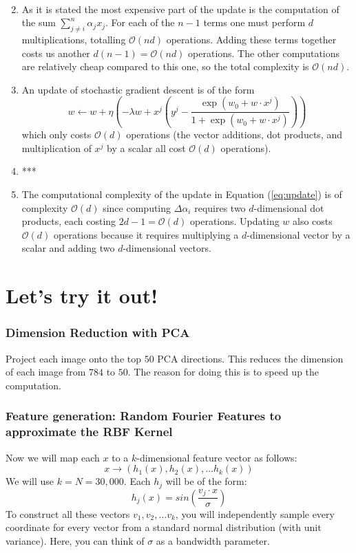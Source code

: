 \documentclass{article}
\begin{document}
\begin{enumerate}
\[\begin{array}{crcl}
		\end{array}
	\]
	\item As it is stated the most expensive part of the update is the computation of the sum $\sum_{j\neq i}^n \alpha_jx_j$. For each of the $n-1$ terms one must perform $d$ multiplications, totalling $\mathcal{O}(nd)$ operations. Adding these terms together costs us another $d(n-1)=\mathcal{O}(nd)$ operations. The other computations are relatively cheap compared to this one, so the total complexity is $\mathcal{O}(nd)$.
	\item An update of stochastic gradient descent is of the form
	\[
		w\leftarrow w + \eta\left(-\lambda w + x^j\left(y^j-\frac{\exp(w_0+w\cdot x^j)}{1+\exp(w_0+w\cdot x^j)} \right)\right)
	\]
	which only costs $\mathcal{O}(d)$ operations (the vector additions, dot products, and multiplication of $x^j$ by a scalar all cost $\mathcal{O}(d)$ operations).
	\item ***
	\item The computational complexity of the update in Equation (\ref{eq:update}) is of complexity $\mathcal{O}(d)$ since computing $\Delta \alpha_i$ requires two $d$-dimensional dot products, each costing $2d-1=\mathcal{O}(d)$ operations. Updating $w$ also costs $\mathcal{O}(d)$ operations because it requires multiplying a $d$-dimensional vector by a scalar and adding two $d$-dimensional vectors.
\end{enumerate}


\section{Let's try it out!}
\subsubsection*{Dimension Reduction with PCA}

Project each image onto the top $50$ PCA directions. This reduces the dimension of each image from $784$ to $50$. The reason for doing this is to speed up the computation.

\subsubsection*{Feature generation: Random Fourier Features to approximate the RBF Kernel}
Now we will map each $x$ to a $k$-dimensional feature vector as follows:
\[
	x \rightarrow (h_1(x), h_2(x), \ldots h_k(x))
\]
We will use $k=N=30,000$.  Each $h_j$ will be of the form:
\[
	h_j(x) = sin\left(\frac{v_j \cdot x}{\sigma}\right)
\]
To construct all these vectors $v_1, v_2,\ldots v_k$, you will independently sample every coordinate for every vector from a standard normal distribution (with unit variance). Here, you can think of $\sigma$ as a bandwidth parameter.
\end{document}
